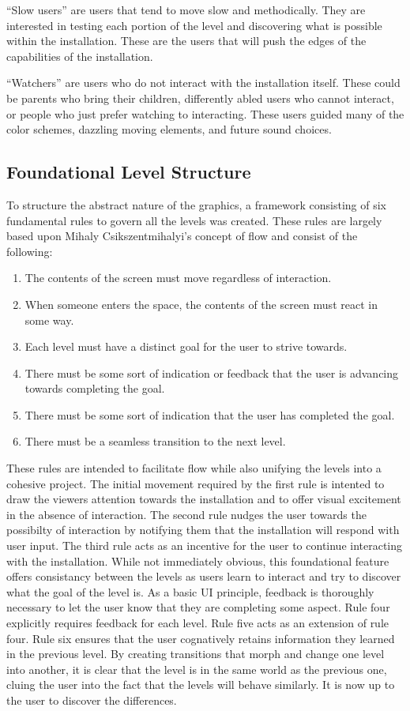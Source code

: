 \documentclass[10pt,twocolumn]{article}
\begin{document}
  ``Slow users'' are users that tend to move slow and methodically.  They are interested in testing each portion of the level and discovering what is possible within the installation. These are the users that will push the edges of the capabilities of the installation. 
 
  ``Watchers'' are users who do not interact with the installation itself. These could be parents who bring their children, differently abled users who cannot interact, or people who just prefer watching to interacting. These users guided many of the color schemes, dazzling moving elements, and future sound choices. 
 
 \subsection{Foundational Level Structure}
To structure the abstract nature of the graphics, a framework consisting of six fundamental rules to govern all the levels was created.  These rules are largely based upon Mihaly Csikszentmihalyi's concept of flow \cite{csikszentmihalyi_flow_1990} and consist of the following:
\begin{enumerate}
  \item The contents of the screen must move regardless of interaction.
  \item When someone enters the space, the contents of the screen must react in some way.
  \item Each level must have a distinct goal for the user to strive towards.
  \item There must be some sort of indication or feedback that the user is advancing towards completing the goal.
  \item There must be some sort of indication that the user has completed the goal. 
  \item There must be a seamless transition to the next level.
\end{enumerate}

These rules are intended to facilitate flow while also unifying the levels into a cohesive project.  The initial movement required by the first rule is intented to draw the viewers attention towards the installation and to offer visual excitement in the absence of interaction.  The second rule nudges the user towards the possibilty of interaction by notifying them that the installation will respond with user input. The third rule acts as an incentive for the user to continue interacting with the installation. While not immediately obvious, this foundational feature offers consistancy between the levels as users learn to interact and try to discover what the goal of the level is. As a basic UI principle, feedback is thoroughly necessary to let the user know that they are completing some aspect.  Rule four explicitly requires feedback for each level. Rule five acts as an extension of rule four. Rule six ensures that the user cognatively retains information they learned in the previous level.  By creating transitions that morph and change one level into another, it is clear that the level is in the same world as the previous one, cluing the user into the fact that the levels will behave similarly.  It is now up to the user to discover the differences. 
\end{document}
